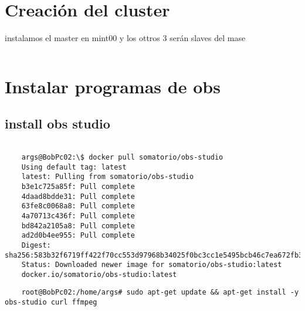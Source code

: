 \documentclass[../main.tex]{subfiles}
\begin{document}
\section{Creación del cluster}
instalamos el master en mint00 y los ottros 3 serán slaves del mase

\begin{lstlisting} 
\end{lstlisting}
\section{Instalar programas de obs}
\subsection{install obs studio}
\begin{lstlisting}
	
	args@BobPc02:\$ docker pull somatorio/obs-studio
	Using default tag: latest
	latest: Pulling from somatorio/obs-studio
	b3e1c725a85f: Pull complete 
	4daad8bdde31: Pull complete 
	63fe8c0068a8: Pull complete 
	4a70713c436f: Pull complete 
	bd842a2105a8: Pull complete 
	ad2d0b4ee955: Pull complete 
	Digest: sha256:583b32f6719ff422f70cc553d97968b34025f0bc3cc1e5495bcb46c7ea672fb3
	Status: Downloaded newer image for somatorio/obs-studio:latest
	docker.io/somatorio/obs-studio:latest
\end{lstlisting}

\begin{lstlisting}
	root@BobPc02:/home/args# sudo apt-get update && apt-get install -y obs-studio curl ffmpeg
\end{lstlisting}
\end{document}
